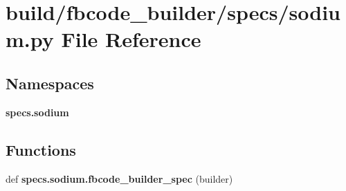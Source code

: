 \section{build/fbcode\+\_\+builder/specs/sodium.py File Reference}
\label{sodium_8py}
\subsection*{Namespaces}
\begin{DoxyCompactItemize}
\item 
 {\bf specs.\+sodium}
\end{DoxyCompactItemize}
\subsection*{Functions}
\begin{DoxyCompactItemize}
\item 
def {\bf specs.\+sodium.\+fbcode\+\_\+builder\+\_\+spec} (builder)
\end{DoxyCompactItemize}
